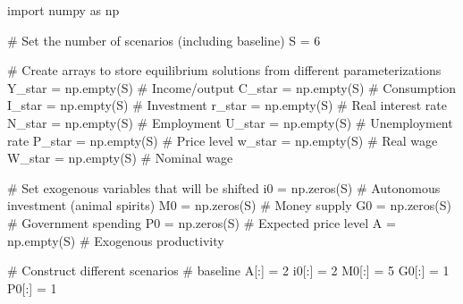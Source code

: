 \documentclass[
  letterpaper,
  DIV=11,
  numbers=noendperiod]{scrreprt}
\newenvironment{Shaded}{\begin{snugshade}}{\end{snugshade}}
\newcommand{\CommentTok}[1]{\textcolor[rgb]{0.37,0.37,0.37}{#1}}
\newcommand{\DecValTok}[1]{\textcolor[rgb]{0.68,0.00,0.00}{#1}}
\newcommand{\ImportTok}[1]{\textcolor[rgb]{0.00,0.46,0.62}{#1}}
\newcommand{\NormalTok}[1]{\textcolor[rgb]{0.00,0.23,0.31}{#1}}
\newcommand{\OperatorTok}[1]{\textcolor[rgb]{0.37,0.37,0.37}{#1}}
\begin{document}
\begin{tcolorbox}[enhanced jigsaw, titlerule=0mm, breakable, bottomrule=.15mm, toprule=.15mm, colbacktitle=quarto-callout-note-color!10!white, rightrule=.15mm, toptitle=1mm, opacityback=0, left=2mm, coltitle=black, title=\textcolor{quarto-callout-note-color}{\faInfo}\hspace{0.5em}{Python code}, colframe=quarto-callout-note-color-frame, opacitybacktitle=0.6, leftrule=.75mm, bottomtitle=1mm, arc=.35mm, colback=white]

\begin{Shaded}
\begin{Highlighting}[]
\ImportTok{import}\NormalTok{ numpy }\ImportTok{as}\NormalTok{ np}

\CommentTok{\# Set the number of scenarios (including baseline)}
\NormalTok{S }\OperatorTok{=} \DecValTok{6}

\CommentTok{\# Create arrays to store equilibrium solutions from different parameterizations}
\NormalTok{Y\_star }\OperatorTok{=}\NormalTok{ np.empty(S)  }\CommentTok{\# Income/output}
\NormalTok{C\_star }\OperatorTok{=}\NormalTok{ np.empty(S)  }\CommentTok{\# Consumption}
\NormalTok{I\_star }\OperatorTok{=}\NormalTok{ np.empty(S)  }\CommentTok{\# Investment}
\NormalTok{r\_star }\OperatorTok{=}\NormalTok{ np.empty(S)  }\CommentTok{\# Real interest rate}
\NormalTok{N\_star }\OperatorTok{=}\NormalTok{ np.empty(S)  }\CommentTok{\# Employment}
\NormalTok{U\_star }\OperatorTok{=}\NormalTok{ np.empty(S)  }\CommentTok{\# Unemployment rate}
\NormalTok{P\_star }\OperatorTok{=}\NormalTok{ np.empty(S)  }\CommentTok{\# Price level}
\NormalTok{w\_star }\OperatorTok{=}\NormalTok{ np.empty(S)  }\CommentTok{\# Real wage}
\NormalTok{W\_star }\OperatorTok{=}\NormalTok{ np.empty(S)  }\CommentTok{\# Nominal wage}

\CommentTok{\# Set exogenous variables that will be shifted}
\NormalTok{i0 }\OperatorTok{=}\NormalTok{ np.zeros(S)  }\CommentTok{\# Autonomous investment (animal spirits)}
\NormalTok{M0 }\OperatorTok{=}\NormalTok{ np.zeros(S)  }\CommentTok{\# Money supply}
\NormalTok{G0 }\OperatorTok{=}\NormalTok{ np.zeros(S)  }\CommentTok{\# Government spending}
\NormalTok{P0 }\OperatorTok{=}\NormalTok{ np.zeros(S)  }\CommentTok{\# Expected price level}
\NormalTok{A }\OperatorTok{=}\NormalTok{ np.empty(S)  }\CommentTok{\# Exogenous productivity}

\CommentTok{\# Construct different scenarios}
\CommentTok{\# baseline}
\NormalTok{A[:] }\OperatorTok{=} \DecValTok{2}
\NormalTok{i0[:] }\OperatorTok{=} \DecValTok{2}
\NormalTok{M0[:] }\OperatorTok{=} \DecValTok{5}
\NormalTok{G0[:] }\OperatorTok{=} \DecValTok{1}
\NormalTok{P0[:] }\OperatorTok{=} \DecValTok{1}


\end{Highlighting}
\end{Shaded}
\end{tcolorbox}
\end{document}
